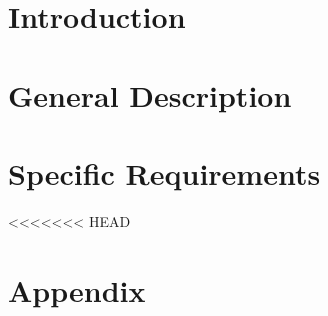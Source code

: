 \maketitle
\clearpage
\tableofcontents

\clearpage
\section{Introduction} \label{Intro}


\clearpage
\section{General Description} \label{Description}


\clearpage
\section{Specific Requirements} \label {Requirements}
<<<<<<< HEAD




\clearpage
\section{Appendix}

